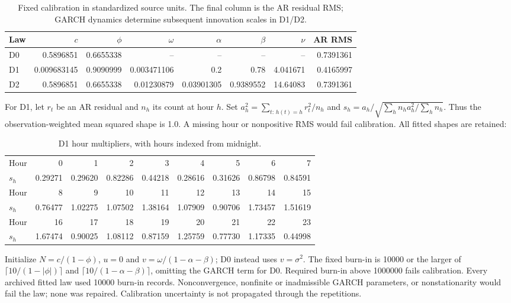 \begin{table}[htbp]\centering\footnotesize

\caption{Fixed calibration in standardized source units. The final column is the AR residual RMS; GARCH dynamics determine subsequent innovation scales in D1/D2.}\label{tab:v8-mc-parameters}

\begin{tabular}{lrrrrrrr}\toprule
Law & $c$ & $\phi$ & $\omega$ & $\alpha$ & $\beta$ & $\nu$ & AR RMS\\\midrule
D0 & 0.5896851 & 0.6655338 & -- & -- & -- & -- & 0.7391361 \\
D1 & 0.009683145 & 0.9090999 & 0.003471106 & 0.2 & 0.78 & 4.041671 & 0.4165997 \\
D2 & 0.5896851 & 0.6655338 & 0.01230879 & 0.03901305 & 0.9389552 & 14.64083 & 0.7391361 \\
\bottomrule\end{tabular}\end{table}

For D1, let $r_t$ be an AR residual and $n_h$ its count at hour $h$. Set $a_h^2=\sum_{t:\,h(t)=h}r_t^2/n_h$ and $s_h=a_h/\sqrt{\sum_h n_ha_h^2/\sum_h n_h}$. Thus the observation-weighted mean squared shape is 1.0. A missing hour or nonpositive RMS would fail calibration. All fitted shapes are retained:

\begin{table}[htbp]\centering\scriptsize

\caption{D1 hour multipliers, with hours indexed from midnight.}\label{tab:v8-mc-hours}

\begin{tabular}{lrrrrrrrr}\toprule
Hour & 0 & 1 & 2 & 3 & 4 & 5 & 6 & 7 \\
$s_h$ & 0.29271 & 0.29620 & 0.82286 & 0.44218 & 0.28616 & 0.31626 & 0.86798 & 0.84591 \\
Hour & 8 & 9 & 10 & 11 & 12 & 13 & 14 & 15 \\
$s_h$ & 0.76477 & 1.02275 & 1.07502 & 1.38164 & 1.07909 & 0.90706 & 1.73457 & 1.51619 \\
Hour & 16 & 17 & 18 & 19 & 20 & 21 & 22 & 23 \\
$s_h$ & 1.67474 & 0.90025 & 1.08112 & 0.87159 & 1.25759 & 0.77730 & 1.17335 & 0.44998 \\
\bottomrule\end{tabular}\end{table}

Initialize $N=c/(1-\phi)$, $u=0$ and $v=\omega/(1-\alpha-\beta)$; D0 instead uses $v=\sigma^2$. The fixed burn-in is 10000 or the larger of $\lceil 10/(1-|\phi|)\rceil$ and $\lceil 10/(1-\alpha-\beta)\rceil$, omitting the GARCH term for D0. Required burn-in above 1000000 fails calibration. Every archived fitted law used 10000 burn-in records. Nonconvergence, nonfinite or inadmissible GARCH parameters, or nonstationarity would fail the law; none was repaired. Calibration uncertainty is not propagated through the repetitions.


